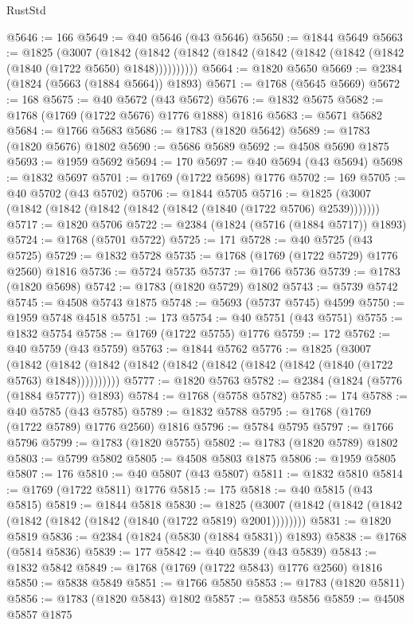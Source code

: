 \begin{lexlean}{RustStd}
\begin{coremodule}
@5646 := 166
@5649 := @40 @5646 (@43 @5646)
@5650 := @1844 @5649
@5663 := @1825
    (@3007
      (@1842 (@1842 (@1842 (@1842 (@1842 (@1842 (@1842 (@1842 (@1840 (@1722 @5650) @1848))))))))))
@5664 := @1820 @5650
@5669 := @2384 (@1824 (@5663 (@1884 @5664)) @1893)
@5671 := @1768 (@5645 @5669)
@5672 := 168
@5675 := @40 @5672 (@43 @5672)
@5676 := @1832 @5675
@5682 := @1768 (@1769 (@1722 @5676) @1776 @1888) @1816
@5683 := @5671 @5682
@5684 := @1766 @5683
@5686 := @1783 (@1820 @5642)
@5689 := @1783 (@1820 @5676) @1802
@5690 := @5686 @5689
@5692 := @4508 @5690 @1875
@5693 := @1959 @5692
@5694 := 170
@5697 := @40 @5694 (@43 @5694)
@5698 := @1832 @5697
@5701 := @1769 (@1722 @5698) @1776
@5702 := 169
@5705 := @40 @5702 (@43 @5702)
@5706 := @1844 @5705
@5716 := @1825 (@3007 (@1842 (@1842 (@1842 (@1842 (@1842 (@1840 (@1722 @5706) @2539)))))))
@5717 := @1820 @5706
@5722 := @2384 (@1824 (@5716 (@1884 @5717)) @1893)
@5724 := @1768 (@5701 @5722)
@5725 := 171
@5728 := @40 @5725 (@43 @5725)
@5729 := @1832 @5728
@5735 := @1768 (@1769 (@1722 @5729) @1776 @2560) @1816
@5736 := @5724 @5735
@5737 := @1766 @5736
@5739 := @1783 (@1820 @5698)
@5742 := @1783 (@1820 @5729) @1802
@5743 := @5739 @5742
@5745 := @4508 @5743 @1875
@5748 := @5693 (@5737 @5745) @4599
@5750 := @1959 @5748 @4518
@5751 := 173
@5754 := @40 @5751 (@43 @5751)
@5755 := @1832 @5754
@5758 := @1769 (@1722 @5755) @1776
@5759 := 172
@5762 := @40 @5759 (@43 @5759)
@5763 := @1844 @5762
@5776 := @1825
    (@3007
      (@1842 (@1842 (@1842 (@1842 (@1842 (@1842 (@1842 (@1842 (@1840 (@1722 @5763) @1848))))))))))
@5777 := @1820 @5763
@5782 := @2384 (@1824 (@5776 (@1884 @5777)) @1893)
@5784 := @1768 (@5758 @5782)
@5785 := 174
@5788 := @40 @5785 (@43 @5785)
@5789 := @1832 @5788
@5795 := @1768 (@1769 (@1722 @5789) @1776 @2560) @1816
@5796 := @5784 @5795
@5797 := @1766 @5796
@5799 := @1783 (@1820 @5755)
@5802 := @1783 (@1820 @5789) @1802
@5803 := @5799 @5802
@5805 := @4508 @5803 @1875
@5806 := @1959 @5805
@5807 := 176
@5810 := @40 @5807 (@43 @5807)
@5811 := @1832 @5810
@5814 := @1769 (@1722 @5811) @1776
@5815 := 175
@5818 := @40 @5815 (@43 @5815)
@5819 := @1844 @5818
@5830 := @1825 (@3007 (@1842 (@1842 (@1842 (@1842 (@1842 (@1842 (@1840 (@1722 @5819) @2001))))))))
@5831 := @1820 @5819
@5836 := @2384 (@1824 (@5830 (@1884 @5831)) @1893)
@5838 := @1768 (@5814 @5836)
@5839 := 177
@5842 := @40 @5839 (@43 @5839)
@5843 := @1832 @5842
@5849 := @1768 (@1769 (@1722 @5843) @1776 @2560) @1816
@5850 := @5838 @5849
@5851 := @1766 @5850
@5853 := @1783 (@1820 @5811)
@5856 := @1783 (@1820 @5843) @1802
@5857 := @5853 @5856
@5859 := @4508 @5857 @1875

\end{coremodule}
\end{lexlean}
